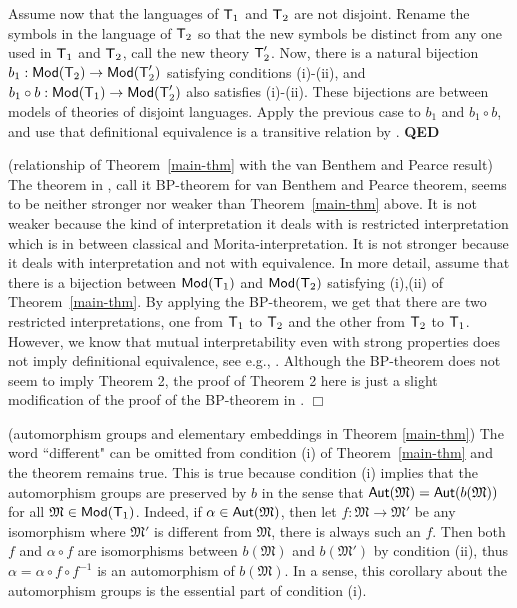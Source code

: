 \documentclass[12pt,leqno]{article}
\newcommand{\Mm}{\mbox{$\mathfrak M$}}
\newcommand{\Aut}{\mbox{\sf Aut}}
\newcommand{\T}{\mbox{\sf T}}
\newcommand{\Mod}{\mbox{\sf Mod}}
\newcommand{\qed}{\hfill\mbox{\bf QED}\bigskip}
\begin{document}
Assume now that the languages of $\T_1$ and $\T_2$ are not disjoint.
Rename the symbols in the language of $\T_2$ so that the new symbols
be distinct from any one used in $\T_1$ and $\T_2$, call the new
theory $\T_2'$. Now, there is a natural bijection
$b_1:\Mod(\T_2)\to\Mod(\T_2')$ satisfying conditions (i)-(ii), and
$b_1\circ b:\Mod(\T_1)\to\Mod(\T_2')$ also satisfies (i)-(ii). These
bijections are between models of theories of disjoint languages.
Apply the previous case to $b_1$ and $b_1\circ b$, and use that
definitional equivalence is a transitive relation by \cite{LSz}.%
\qed\bigskip

(relationship of Theorem~\ref{main-thm} with the van Benthem and Pearce result)
The theorem in \cite{vBP}, call it BP-theorem for van Benthem and Pearce theorem,  seems to be neither stronger nor weaker than Theorem~\ref{main-thm} above. It is not weaker because the kind of interpretation it deals with is restricted interpretation which is in between classical and Morita-interpretation. It is not stronger because it deals with interpretation and not with equivalence. In more detail, assume that there is a bijection between $\Mod(\T_1)$ and $\Mod(\T_2)$ satisfying (i),(ii) of Theorem~\ref{main-thm}.  By applying the BP-theorem, we get that there are two restricted interpretations, one from $\T_1$ to $\T_2$ and the other from $\T_2$ to $\T_1$.  However, we know that mutual interpretability even with strong properties does not imply definitional equivalence, see e.g., \cite{AMNMLQ}.  Although the BP-theorem does not seem to imply Theorem 2, the proof of Theorem 2 here is just a slight modification of the proof of the BP-theorem in \cite[p.296]{vBP}. \quad $\Box$
\bigskip

(automorphism groups and elementary embeddings in Theorem \ref{main-thm})
 The word ``different" can be omitted from condition (i) of
Theorem~\ref{main-thm} and the theorem remains true. This is true
because condition (i) implies that the automorphism groups are
preserved by $b$ in the sense that $\Aut(\Mm)=\Aut(b(\Mm))$ for all
$\Mm\in\Mod(\T_1)$.
%
Indeed, if $\alpha\in\Aut(\Mm)$, then let $f:\Mm\to\Mm'$ be any
isomorphism where $\Mm'$ is different from $\Mm$, there is always
such an $f$. Then both $f$ and $\alpha\circ f$ are isomorphisms
between $b(\Mm)$ and $b(\Mm')$ by condition (ii), thus
$\alpha=\alpha\circ f\circ f^{-1}$ is an automorphism of $b(\Mm)$.
%
In a sense, this corollary about the automorphism groups is the
essential part of condition (i).
\end{document}
